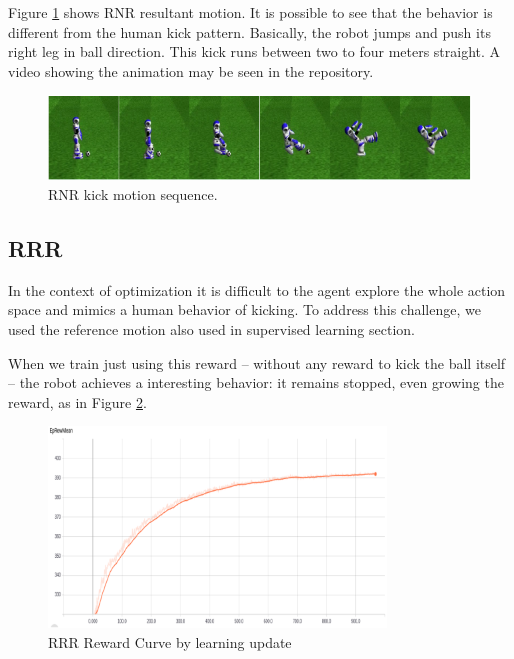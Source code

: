 Figure \ref{fig:rnr_kick_sequence} shows RNR resultant motion. It is possible to see that the behavior is different from the human kick pattern. Basically, the robot jumps and push its right leg in ball direction. This kick runs between two to four meters straight. A video showing the animation may be seen in the repository.

\begin{figure}[!htbp]
	\centering
	\includegraphics[width=1.0\textwidth]{Cap6/rnr_kick_sequence.eps}
	\caption{RNR kick motion sequence.}
	\label{fig:rnr_kick_sequence}
\end{figure}

\subsection{RRR}\label{sec:rrr}

In the context of optimization it is difficult to the agent explore the whole action space and mimics a human behavior of kicking. To address this challenge, we used the reference motion also used in supervised learning section.

When we train just using this reward -- without any reward to kick the ball itself -- the robot achieves a interesting behavior: it remains stopped, even growing the reward, as in Figure \ref{fig:rrrreward}.

\begin{figure}[!htbp]
	\centering
	\includegraphics[width=0.8\textwidth]{Cap6/rrrreward.eps}
	\caption{RRR Reward Curve by learning update}
	\label{fig:rrrreward}
\end{figure}

